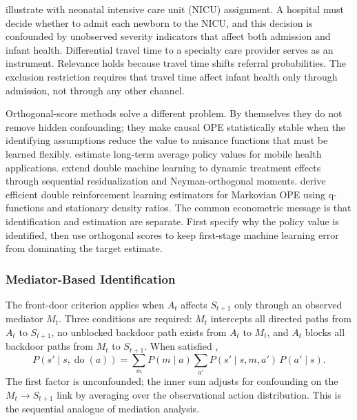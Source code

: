 \citet{liao2024_iv_rl} illustrate with neonatal intensive care unit (NICU) assignment. A hospital must decide whether to admit each newborn to the NICU, and this decision is confounded by unobserved severity indicators that affect both admission and infant health. Differential travel time to a specialty care provider serves as an instrument. Relevance holds because travel time shifts referral probabilities. The exclusion restriction requires that travel time affect infant health only through admission, not through any other channel.

Orthogonal-score methods solve a different problem. By themselves they do not remove hidden confounding; they make causal OPE statistically stable when the identifying assumptions reduce the value to nuisance functions that must be learned flexibly. \citet{liaoMurphy2021longterm} estimate long-term average policy values for mobile health applications. \citet{lewisSyrgkanis2021dynamicDML} extend double machine learning to dynamic treatment effects through sequential residualization and Neyman-orthogonal moments. \citet{kallusUehara2022doubleRL} derive efficient double reinforcement learning estimators for Markovian OPE using q-functions and stationary density ratios. The common econometric message is that identification and estimation are separate. First specify why the policy value is identified, then use orthogonal scores to keep first-stage machine learning error from dominating the target estimate.

\subsubsection{Mediator-Based Identification}
\label{subsubsec:mediator_identification}

The front-door criterion applies when $A_t$ affects $S_{t+1}$ only through an observed mediator $M_t$. Three conditions are required: $M_t$ intercepts all directed paths from $A_t$ to $S_{t+1}$, no unblocked backdoor path exists from $A_t$ to $M_t$, and $A_t$ blocks all backdoor paths from $M_t$ to $S_{t+1}$. When satisfied \citep{pearl2009causality},
\begin{equation}
P(s' \mid s, \operatorname{do}(a)) = \sum_{m} P(m \mid a) \sum_{a'} P(s' \mid s, m, a') \, P(a' \mid s).
\label{eq:frontdoor}
\end{equation}
The first factor is unconfounded; the inner sum adjusts for confounding on the $M_t \to S_{t+1}$ link by averaging over the observational action distribution. This is the sequential analogue of mediation analysis.

